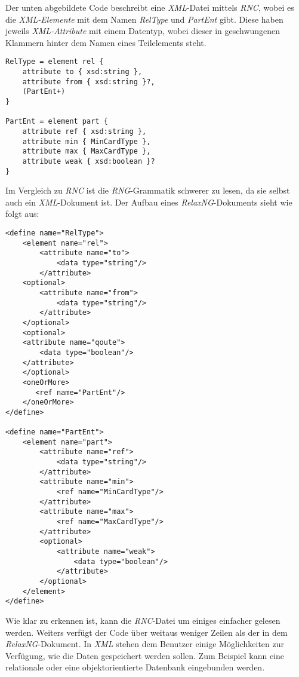 \noindent
Der unten abgebildete Code beschreibt eine \textit{XML}-Datei mittels \textit{RNC}, wobei es die \textit{XML-Elemente} mit dem Namen \textit{RelType} und \textit{PartEnt} gibt. Diese haben jeweils \textit{XML-Attribute} mit einem Datentyp, wobei dieser in geschwungenen Klammern hinter dem Namen eines Teilelements steht.
\\

\begin{verbatim}
RelType = element rel {
    attribute to { xsd:string },
    attribute from { xsd:string }?,
    (PartEnt+)
}

PartEnt = element part {
    attribute ref { xsd:string },
    attribute min { MinCardType },
    attribute max { MaxCardType },
    attribute weak { xsd:boolean }?
}
\end{verbatim}

\noindent
Im Vergleich zu \textit{RNC} ist die \textit{RNG}-Grammatik schwerer zu lesen, da sie selbst auch ein \textit{XML}-Dokument ist. Der Aufbau eines \textit{RelaxNG}-Dokuments sieht wie folgt aus:
\\
\pra

\begin{verbatim}
<define name="RelType">
    <element name="rel">
        <attribute name="to">
            <data type="string"/>
        </attribute>
    <optional>
        <attribute name="from">
            <data type="string"/>
        </attribute>
    </optional>
    <optional>
    <attribute name="qoute">
        <data type="boolean"/>
    </attribute>
    </optional>
    <oneOrMore>
       <ref name="PartEnt"/>
    </oneOrMore>     
</define>

<define name="PartEnt">
    <element name="part">
        <attribute name="ref">
            <data type="string"/>
        </attribute>
        <attribute name="min">
            <ref name="MinCardType"/>
        </attribute>
        <attribute name="max">
            <ref name="MaxCardType"/>
        </attribute>
        <optional>
            <attribute name="weak">
                <data type="boolean"/>
            </attribute>
        </optional>
    </element>
</define>
\end{verbatim}
\pra
\noindent
Wie klar zu erkennen ist, kann die \textit{RNC}-Datei um einiges einfacher gelesen werden. Weiters verfügt der Code über weitaus weniger Zeilen als der in dem \textit{RelaxNG}-Dokument.
\noindent
In \textit{XML} stehen dem Benutzer einige Möglichkeiten zur Verfügung, wie die Daten gespeichert werden sollen. Zum Beispiel kann eine relationale oder eine objektorientierte Datenbank eingebunden werden. 

